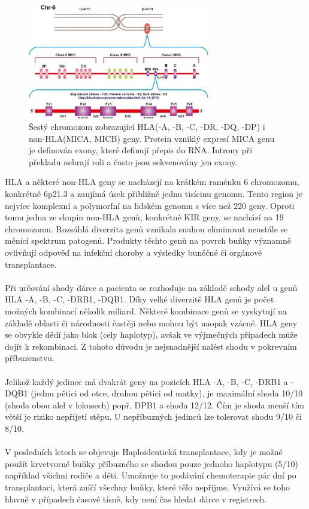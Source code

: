 \documentclass[czech,DP]{thesiskiv}
\numberwithin{equation}{section}
\begin{document}
\begin{figure}[H]		
		\centering
		\includegraphics[width=300px]{./img/genom6_mica.jpg}
		\caption{Šestý chromozom zobrazující HLA(-A, -B, -C, -DR, -DQ, -DP) i non-HLA(MICA, MICB) geny. Protein vzniklý expresí MICA genu je definován exony, které definují přepis do RNA. Introny při překladu nehrají roli a často jsou sekvenovány jen exony. \cite{chromozome6_mica} 
		}
		\label{fig:hla_genome}
\end{figure}

\noindent
HLA a některé non-HLA geny se nacházejí na krátkém raménku 6 chromozomu, konkrétně 6p21.3 a zaujímá úsek přibližně jednu tisícinu genomu. Tento region je nejvíce komplexní a polymorfní na lidském genomu s více než 220 geny. Oproti tomu jedna ze skupin non-HLA genů, konkrétně KIR geny, se nachází na 19 chromozomu. Rozsáhlá diverzita genů vznikala snahou eliminovat neustále se měnící spektrum patogenů. Produkty těchto genů na povrch buňky významně ovlivňují odpověď na infekční choroby a výsledky buněčné či orgánové transplantace. \cite{imgt_hla_database}
\\
\\
Při určování shody dárce a pacienta se rozhoduje na základě schody alel u genů HLA -A, -B, -C, -DRB1, -DQB1. Díky velké diverzitě HLA genů je počet možných kombinací několik miliard. Některé kombinace genů se vyskytují na základě oblasti či národnosti častěji nebo mohou být naopak vzácné. HLA geny se obvykle dědí jako blok (cely haplotyp), avšak ve výjmečných případech může dojít k rekombinaci. Z tohoto důvodu je nejsnadnější nalést shodu v pokrevním příbuzenstvu.
\\
\\
Jelikož každý jedinec má dvakrát geny na pozicích HLA -A, -B, -C, -DRB1 a -DQB1 (jednu pětici od otce, druhou pětici od matky), je maximální shoda 10/10 (shoda obou alel v lokusech) popř, DPB1 a shoda 12/12. Čím je shoda menší tím větší je riziko nepřijetí stěpu. U nepříbuzných jedinců lze tolerovat shodu 9/10 či 8/10. \cite{Frycova_bakalarka} \cite{KIR_transplantace_jindra}
\\
\\
V posledních letech se objevuje Haploidentická transplantace, kdy je možné použít krvetvorné buňky příbuzného se shodou pouze jednoho haplotypu (5/10) například všichni rodiče a děti. Umožnuje to podávání chemoterapie pár dní po transplantaci, která zníčí všechny buňky, které tělo nepřijme. Využívá se toho hlavně v případech časové tísně, kdy není čas hledat dárce v registrech. \cite{haploidenticka_transplantace}
\end{document}
